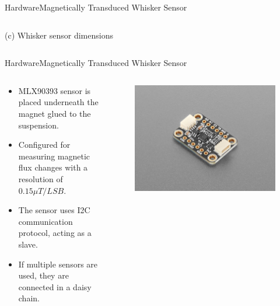 \documentclass[AIRbeamer
,optEnglish
,optBiber
,optBibstyleAlphabetic
,optBeamerClassicFormat%
]{AIRlatex}
\begin{document}
\begin{frame}[c]{Hardware}{Magnetically Transduced Whisker Sensor}
\begin{columns}[c,onlytextwidth]
            (c) Whisker sensor dimensions
        \end{columns}
    \end{frame}


    \begin{frame}{Hardware}{Magnetically Transduced Whisker Sensor}
        \begin{columns}[T,onlytextwidth]
            \begin{column}[T]{0.4\textwidth}
                \begin{itemize}
                    \item MLX90393 sensor is placed underneath the magnet glued to the suspension.
                    \item Configured for measuring magnetic flux changes with a resolution of \(0.15 \mu T/LSB\).
                    \item The sensor uses I2C communication protocol, acting as a slave.
                    \item If multiple sensors are used, they are connected in a daisy chain.
                \end{itemize}
            \end{column}
            \begin{column}[T]{0.6\textwidth}
                \begin{figure}[H]
                    \centering
                    \includegraphics[height=0.3\textheight]{figures/mlx90393}

\end{figure}
\end{column}
\end{columns}
\end{frame}
\end{document}
